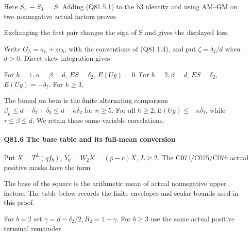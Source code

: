 Here \(S_v^- -S_3^-=S\). Adding (Q81.5.1) to the b3 identity and using
AM--GM on two nonnegative actual factors proves


Exchanging the first pair changes the sign of S and gives the displayed loss.

Write \(G_h=a_h+z c_h\), with the conventions of (Q81.1.4), and put
\(\zeta=\delta_2/d\) when \(d>0.\) Direct skew integration gives


For \(h=1,\allowbreak  \alpha=\beta=d\), \(ES=\delta_2\), \(E(Ug)=0\).
For \(h=2,\allowbreak  \beta=d\), \(ES=\delta_2\), \(E(Ug)=-\delta_2\).
For \(h\ge 3,\allowbreak \)


The bound on beta is the finite alternating comparison
\(\beta_n\le d-\delta_2+\delta_3\le d-\kappa \delta_2\) for \(n\ge 5.\)
For all \(h\ge 2,\allowbreak  E(Ug)\le-\kappa \delta_2\), while
\(\tau\le\beta\le d\). We retain these same-variable correlations.

\paragraph{Q81.6 The base table and its full-mean conversion}

Put \(X=T^L(qf_b)\), \(Y_0=W_2X=(p-r)X\), \(L\ge 2.\)
The C071/C075/C076 actual positive masks have the form


The base of the square is the arithmetic mean of actual nonnegative
upper factors. The table below records the finite envelopes and scalar bounds used in this proof.

For \(b=2\) set \(\gamma=d-\delta_2/2,\allowbreak  B_2=1-\gamma\).
For \(b\ge 3\) use the same actual positive terminal remainder



